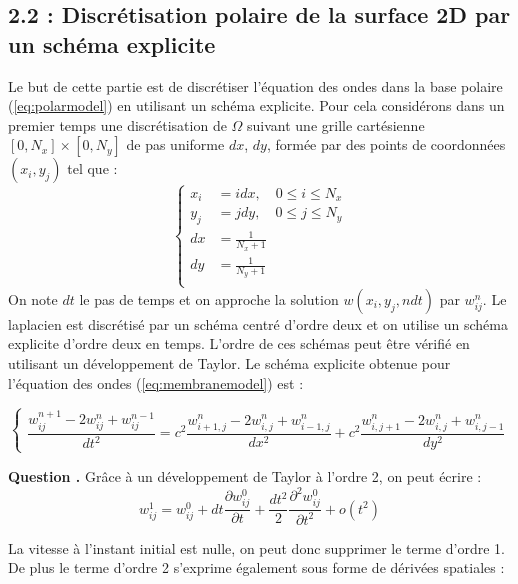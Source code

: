 \documentclass[a4,12pt]{article}
\newcounter{Nbquestion}
\newcommand*\question{%
  \stepcounter{Nbquestion}%
  \textbf{Question \theNbquestion. }}
\begin{document}
			  \subsection*{2.2 : Discrétisation polaire de la surface 2D par un schéma explicite }
			  Le but de cette partie est de discrétiser l'équation des ondes dans la base polaire (\ref{eq:polarmodel}) en utilisant un schéma explicite. Pour cela considérons dans un premier temps une discrétisation de $\Omega $ suivant une grille cartésienne $[0,N_x]\times [0,N_y]$ de pas uniforme $dx$, $dy$, formée par des points de coordonnées $(x_i,y_j)$ tel que :
			  \begin{equation*}{}
			    \left\{
			      \begin{array}{rl}
				x_i &=i dx,\quad 0\leq i \leq N_x \\
				y_j &=j dy,\quad  0\leq j \leq N_y \\
				dx & =\frac{1}{N_x+1}\\
				dy &=\frac{1}{N_y+1}\\
			      \end{array}
			      \right.
			    \end{equation*}
			    On note $dt$ le pas de temps et on approche la solution $w(x_i,y_j,ndt)$ par $w_{ij}^{n}$. Le laplacien est discrétisé  par un schéma centré d'ordre deux  et on utilise un schéma explicite d'ordre deux en temps. L'ordre de ces schémas peut être vérifié en utilisant un développement de Taylor. Le schéma explicite obtenue pour l'équation des ondes (\ref{eq:membranemodel}) est :

			    \begin{equation}
			      \left\{
				\begin{array}{rl}
				  \dfrac{w_{ij}^{n+1}-2w_{ij}^{n}+w_{ij}^{n-1}}{dt^{2}}=c^2\dfrac{w_{i+1,j}^{n}-2w_{i,j}^{n}+w_{i-1,j}^{n}}
				  {dx^{2}}+c^2\dfrac{w_{i,j+1}^{n}-2w_{i,j}^{n}+w_{i,j-1}^{n}}{dy^{2}}
				\end{array}
				\right.
				\label{eq:diffcartesiennes}
			      \end{equation}


			      \question Grâce à un développement de Taylor à
			      l'ordre 2, on
			      peut écrire :
			      \[
				w_{ij}^1 = w_{ij}^0 + dt\frac{\partial w_{ij}^0}{\partial t} + \frac{dt^2}{2}\frac{\partial^2 w_{ij}^0}{\partial t^2} + o(t^2)
			      \]

			      La vitesse à l'instant initial est nulle, on peut donc supprimer le
			      terme d'ordre 1. De plus le terme d'ordre 2 s'exprime également sous
			      forme de dérivées spatiales :
\end{document}
